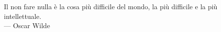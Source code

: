 \cleardoublepage
{}
\thispagestyle{empty}

\vspace*{3cm}

\begin{center}
Il non fare nulla è la cosa più difficile del mondo, la più difficile e
la più intellettuale. \\ \medskip
--- Oscar Wilde    
\end{center}

